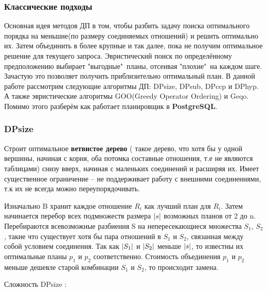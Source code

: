 \documentclass[12pt]{article}
\begin{document}
\begin{flushleft}
\centering \subsubsection*{Классические подходы}
\raggedright

Основная идея методов ДП в том, чтобы разбить задачу поиска оптимального
порядка на меньшие(по размеру соединяемых отношений) и решить оптимально их. Затем 
объединить в более крупные и так далее, пока не получим оптимальное решение 
для текущего запроса.
\newline
Эвристический поиск по определённому предположению выбирает
"выгодные"\ планы, отсеивая "плохие"\, на каждом шаге. Зачастую это позволяет
получить приблизительно оптимальный план.
\newline
В данной работе рассмотрим следующие алгоритмы ДП: DPsize, DPsub, DPccp и 
DPhyp. А также эвристические алгоритмы GOO(Greedy Operator Ordering) и 
Geqo. Помимо этого разберём как работает планировщик в \textbf{PostgreSQL}.

\centering \subsubsection*{DPsize \cite[стр. 157]{Thomas}} 
\raggedright

Строит оптимальное \textbf{ветвистое дерево} ( такое дерево, что хотя бы у одной вершины,
начиная с корня, оба потомка составные отношения, т.е не являются таблицами)
снизу вверх, начиная с маленьких соединений и расширяя их. Имеет существенное ограничение -- 
не поддерживает работу с внешними соединениями, т.к их не всегда можно переупорядочивать.


Изначально B хранит каждое отношение $R_i$ как лучший план для $R_i$. 
Затем начинается перебор всех подмножеств размера $\lvert s\rvert$ возможных 
планов от 2 до n. Перебираются всевозможные разбиения S на непересекающиеся 
множества $S_1$, $S_2$, такие что существует хотя бы пара отношений в $S_1$ 
и $S_2$, связанная между собой условием соединения. Так как $\lvert S_1\rvert$ и 
$\lvert S_2\rvert$ меньше $\lvert s\rvert$, то известны их оптимальные планы $p_1$ и $p_2$ соответственно. 
Стоимость объединения $p_1$ и $p_2$ меньше дешевле старой комбинации $S_1$ и 
$S_2$,  то происходит замена.

Сложность DPsize \cite{Moerkotte}:


\end{flushleft}
\end{document}
